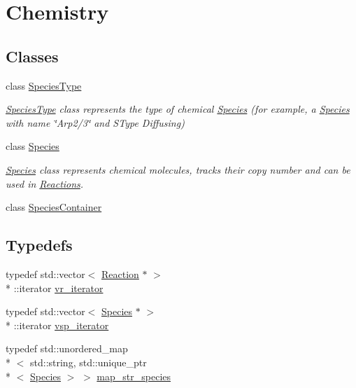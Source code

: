 \hypertarget{group__Chemistry}{\section{Chemistry}
\label{group__Chemistry}
}
\subsection*{Classes}
\begin{DoxyCompactItemize}
\item 
class \hyperlink{classSpeciesType}{Species\-Type}
\begin{DoxyCompactList}\small\item\em \hyperlink{classSpeciesType}{Species\-Type} class represents the type of chemical \hyperlink{classSpecies}{Species} (for example, a \hyperlink{classSpecies}{Species} with name \char`\"{}\-Arp2/3\char`\"{} and S\-Type Diffusing) \end{DoxyCompactList}\item 
class \hyperlink{classSpecies}{Species}
\begin{DoxyCompactList}\small\item\em \hyperlink{classSpecies}{Species} class represents chemical molecules, tracks their copy number and can be used in \hyperlink{classReaction}{Reactions}. \end{DoxyCompactList}\item 
class \hyperlink{classSpeciesContainer}{Species\-Container}
\end{DoxyCompactItemize}
\subsection*{Typedefs}
\begin{DoxyCompactItemize}
\item 
typedef std\-::vector$<$ \hyperlink{classReaction}{Reaction} $\ast$ $>$\\*
\-::iterator \hyperlink{group__Chemistry_ga3ffcd49efdca1415b74d13f1b9fea3e4}{vr\-\_\-iterator}
\item 
typedef std\-::vector$<$ \hyperlink{classSpecies}{Species} $\ast$ $>$\\*
\-::iterator \hyperlink{group__Chemistry_ga3445ce7f270a9e9eb12a76b1da415dc4}{vsp\-\_\-iterator}
\item 
typedef std\-::unordered\-\_\-map\\*
$<$ std\-::string, std\-::unique\-\_\-ptr\\*
$<$ \hyperlink{classSpecies}{Species} $>$ $>$ \hyperlink{group__Chemistry_ga19c0082cabeed7d195eb9a1bc1aca13f}{map\-\_\-str\-\_\-species}
\end{DoxyCompactItemize}
